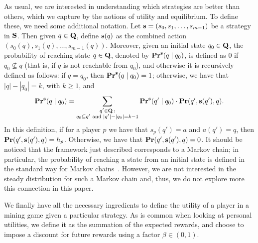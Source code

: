 As usual, we are interested in understanding which strategies are better than others, which we capture by the notions of  utility and equilibrium. To define these, we need some additional notation.
Let $\mathbf{s} = (s_0, s_1, \ldots, s_{m-1})$ be a strategy in $\mathbf{S}$. Then given $q \in \mathbf{Q}$, define $\mathbf{s}(q)$ as the combined action $(s_0(q), s_1(q), \ldots, s_{m-1}(q))$. Moreover, given an initial state $q_0 \in \mathbf{Q}$,
the probability of reaching state $q \in \mathbf{Q}$, denoted by $\mathbf{Pr}^{\mathbf{s}}(q \mid q_0)$, is defined as 0 if $q_0 \not\subseteq q$ (that is, if $q$ is not reachable from $q_0$), and otherwise it is recursively defined as follows: if $q =  q_0$, then $\mathbf{Pr}^{\mathbf{s}}(q \mid q_0) = 1$; otherwise, we have that $|q| - |q_0| = k$, with $k \geq 1$, and
$$
\mathbf{Pr}^{\mathbf{s}}(q \mid q_0) =
\sum_{\substack{q' \in \mathbf{Q} \,:\\ q_0 \subseteq q' \text{ and } |q'| - |q_0| = k-1}}
 \mathbf{Pr}^{\mathbf{s}}(q' \mid q_0) \cdot \mathbf{Pr}(q', \mathbf{s}(q'), q).
 $$
In this definition, if for a player $p$ we have that $s_p(q') = a$ and $a(q') = q$, then $\mathbf{Pr}(q', \mathbf{s}(q'), q) = h_p$. Otherwise, we have that $\mathbf{Pr}(q', \mathbf{s}(q'), q) = 0$.
It should be noticed that the framework just described corresponds to a Markov chain; in particular, the probability of reaching a state from an initial state is defined in the standard way for Markov chains~\cite{MU05}. However, we are not interested in the steady distribution for such a Markov chain and, thus, we do not explore more this connection in this paper.

We finally have all the necessary ingredients to define the utility of a player in a mining game given a particular strategy. As is common
when looking at personal utilities, we define it as the summation of the expected rewards, and choose
to impose a discount for future rewards using a factor $\beta \in (0,1)$.

